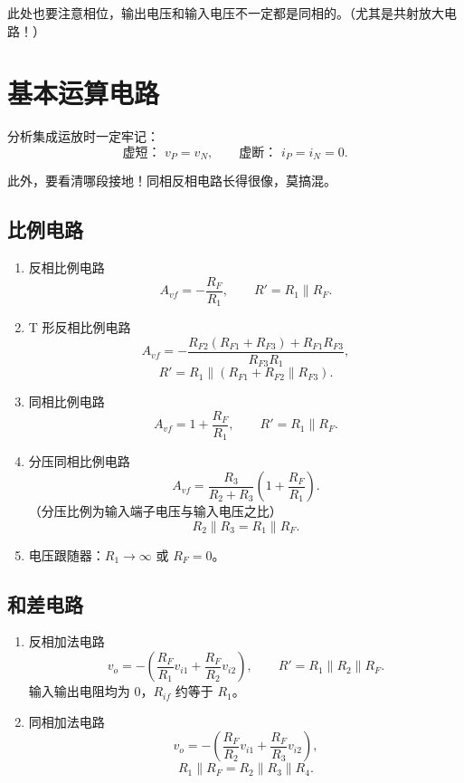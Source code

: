 \documentclass[UTF8,fontset=fandol,zihao=5]{ctexart}
\newcommand{\parallelsum}{\mathbin{\|}}
\begin{document}
{\begin{methodbox}[【技巧】闭环源电压增益]
此处也要注意相位，输出电压和输入电压不一定都是同相的。（尤其是共射放大电路！）
\end{methodbox}

\section{基本运算电路}

分析集成运放时一定牢记：
\[
  \text{虚短： }v_P=v_N,
  \qquad
  \text{虚断： }i_P=i_N=0.
\]

此外，要看清哪段接地！同相反相电路长得很像，莫搞混。

\subsection{比例电路}

\begin{enumerate}
  \item 反相比例电路
  \[
    A_{vf}=-\frac{R_F}{R_1},
    \qquad
    R'=R_1\parallelsum R_F.
  \]

  \item T 形反相比例电路
  \[
    A_{vf}=-\frac{R_{F2}(R_{F1}+R_{F3})+R_{F1}R_{F3}}{R_{F3}R_1},
  \]
  \[
    R'=R_1\parallelsum(R_{F1}+R_{F2}\parallelsum R_{F3}).
  \]

  \item 同相比例电路
  \[
    A_{vf}=1+\frac{R_F}{R_1},
    \qquad
    R'=R_1\parallelsum R_F.
  \]

  \item 分压同相比例电路
  \[
    A_{vf}=\frac{R_3}{R_2+R_3}\left(1+\frac{R_F}{R_1}\right).
  \]
  （分压比例为输入端子电压与输入电压之比）
  \[
    R_2\parallelsum R_3=R_1\parallelsum R_F.
  \]

  \item 电压跟随器：$R_1\to\infty$ 或 $R_F=0$。
\end{enumerate}

\subsection{和差电路}

\begin{enumerate}
  \item 反相加法电路
  \[
    v_o=-\left(\frac{R_F}{R_1}v_{i1}+\frac{R_F}{R_2}v_{i2}\right),
    \qquad
    R'=R_1\parallelsum R_2\parallelsum R_F.
  \]
  输入输出电阻均为 0，$R_{if}$ 约等于 $R_1$。

  \item 同相加法电路
  \[
    v_o=-\left(\frac{R_F}{R_2}v_{i1}+\frac{R_F}{R_3}v_{i2}\right),
  \]
  \[
    R_1\parallelsum R_F=R_2\parallelsum R_3\parallelsum R_4.
  \]


\end{enumerate}}
\end{document}
